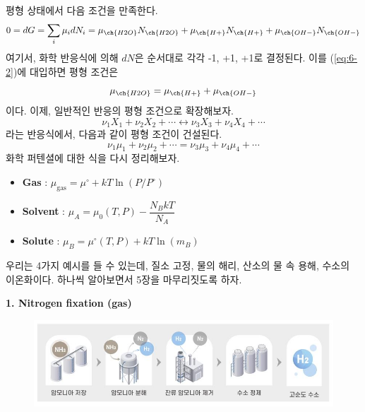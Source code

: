 \documentclass{article}
\begin{document}
평형 상태에서 다음 조건을 만족한다.
\begin{equation}\label{eq:6-2}
    0 = dG = \sum_i \mu_i dN_i = \mu_{\ch{H2O}} N_{\ch{H2O}} + \mu_{\ch{H+}} N_{\ch{H+}} + \mu_{\ch{OH-}} N_{\ch{OH-}}
\end{equation}
여기서, 화학 반응식에 의해 $dN$은 순서대로 각각 -1, +1, +1로 결정된다. 이를 (\ref{eq:6-2})에 대입하면 평형 조건은
\begin{equation}
    \mu_{\ch{H2O}} = \mu_{\ch{H+}} + \mu_{\ch{OH-}}
\end{equation}
이다. 이제, 일반적인 반응의 평형 조건으로 확장해보자. 
\begin{equation}
        \nu_1 X_1 + \nu_2 X_2 + \cdots \leftrightarrow \nu_3 X_3 + \nu_4 X_4 + \cdots
\end{equation}
라는 반응식에서, 다음과 같이 평형 조건이 건설된다.
\begin{equation}
    \nu_1 \mu_1 + \nu_2 \mu_2 + \cdots = \nu_3 \mu_3 + \nu_4 \mu_4 + \cdots
\end{equation}
화학 퍼텐셜에 대한 식을 다시 정리해보자.
\begin{itemize}
    \item \textbf{Gas} : $\mu_\text{gas} = \mu^\circ + kT \ln (P/P^\circ)$
    \item \textbf{Solvent} : $\mu_A = \mu_0 (T,P) - \dfrac{N_B kT}{N_A}$
    \item \textbf{Solute} : $\mu_B = \mu^\circ (T,P) + kT \ln (m_B)$
\end{itemize}
우리는 4가지 예시를 들 수 있는데, 질소 고정, 물의 해리, 산소의 물 속 용해, 수소의 이온화이다. 하나씩 알아보면서 5장을 마무리짓도록 하자.

\newpage

\noindent
\textbf{1. Nitrogen fixation (gas)}

\begin{figure}[h]
    \centering
    \includegraphics[width=0.65\linewidth]{images/fig6_2.png}
\end{figure}
\end{document}

